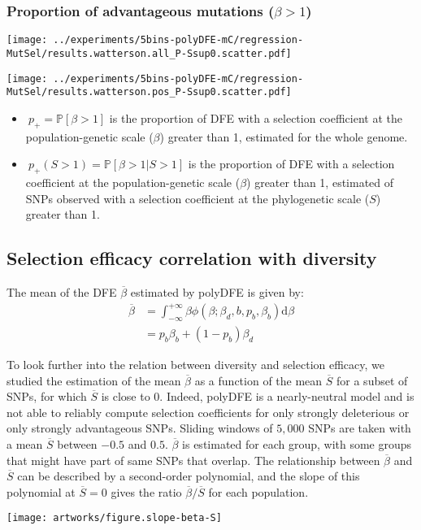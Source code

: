 \documentclass{article}
\newcommand{\der}{\mathrm{d}}
\newcommand{\proba}{\mathbb{P}}
\newcommand{\Sphy}{S}
\newcommand{\SphyMean}{\overline{\Sphy}}
\newcommand{\divAdv}{ \Sphy > 1}
\newcommand{\Spop}{\beta}
\newcommand{\SpopMean}{\overline{\Spop}}
\newcommand{\polyAdv}{ \Spop > 1}
\begin{document}
    \subsubsection{Proportion of advantageous mutations ($\polyAdv$)}\label{subsec:proportion-advantageous-mutations}
    \begin{minipage}{0.32\linewidth}
        \texttt{[image: ../experiments/5bins-polyDFE-mC/regression-MutSel/results.watterson.all\_P-Ssup0.scatter.pdf]}
    \end{minipage}
    \begin{minipage}{0.32\linewidth}
        \texttt{[image: ../experiments/5bins-polyDFE-mC/regression-MutSel/results.watterson.pos\_P-Ssup0.scatter.pdf]}
    \end{minipage}
    \begin{itemize}
        \item $\ p_+ = \proba [ \polyAdv  ]$ is the proportion of DFE with a selection coefficient at the population-genetic scale ($\Spop$) greater than 1, estimated for the whole genome.
        \item $\ p_+( \divAdv) = \proba [ \polyAdv | \divAdv] $ is the proportion of DFE with a selection coefficient at the population-genetic scale ($\Spop$) greater than 1, estimated of SNPs observed with a selection coefficient at the phylogenetic scale ($\Sphy$) greater than 1.
    \end{itemize}

    \subsection{Selection efficacy correlation with diversity}\label{subsec:selection-efficacy-correlation-with-diversity}
    The mean of the DFE $\SpopMean$ estimated by polyDFE is given by:
    \begin{align*}
        \SpopMean & = \int_{-\infty}^{+\infty} \Spop \phi \left( \Spop; \Spop_d , b, p_b, \Spop_b \right) \der \Spop \\
        & =  p_b \Spop_b + \left( 1 - p_b \right) \Spop_d
    \end{align*}

    To look further into the relation between diversity and selection efficacy, we studied the estimation of the mean $\SpopMean$ as a function of the mean $\SphyMean$ for a subset of SNPs, for which $\SphyMean$ is close to $0$.
    Indeed, polyDFE is a nearly-neutral model and is not able to reliably compute selection coefficients for only strongly deleterious or only strongly advantageous SNPs.
    Sliding windows of $5,000$ SNPs are taken with a mean $\SphyMean$ between $-0.5$ and $0.5$.
    $\SpopMean$ is estimated for each group, with some groups that might have part of same SNPs that overlap.
    The relationship between $\SpopMean$ and $\SphyMean$ can be described by a second-order polynomial, and the slope of this polynomial at $\SphyMean=0$ gives the ratio $\SpopMean/\SphyMean$ for each population.
    \begin{center}
        \texttt{[image: artworks/figure.slope-beta-S]}
    \end{center}
\end{document}

